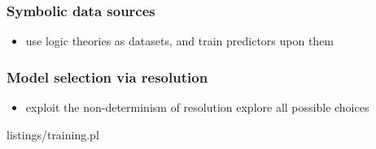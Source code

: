 \documentclass[presentation]{beamer}\mode<presentation>{\usetheme{AMSBolognaFC}}
\begin{document}
\begin{frame}%
    \frametitle{Symbolic data sources}

    \begin{itemize}
        \item use logic theories as datasets, and train predictors upon them
    \end{itemize}


\end{frame}

\begin{frame}[allowframebreaks]
    \frametitle{Model selection via resolution}

    \begin{itemize}
        \item exploit the non-determinism of resolution explore all possible choices
    \end{itemize}

    \prologimport%
    {listings/training.pl}

\end{frame}
\end{document}
